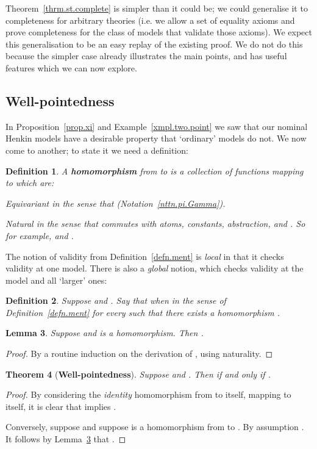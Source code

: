 \documentclass[submission,copyright]{eptcs}
\newtheorem{thrm}{Theorem}[section]
\newtheorem{lemm}[thrm]{Lemma}
\newtheorem{defn}[thrm]{Definition}
\newcommand{\deffont}[1]{\textbf{#1}}
\begin{document}
Theorem~\ref{thrm.st.complete} is simpler than it could be; we could generalise it to completeness for arbitrary theories (i.e. we allow a set of equality axioms and prove completeness for the class of models that validate those axioms).  
We expect this generalisation to be an easy replay of the existing proof.
We do not do this because the simpler case already illustrates the main points, and has useful features which we can now explore.

\subsection{Well-pointedness}
\label{subsect.well-pointed}


In Proposition~\ref{prop.xi} and Example~\ref{xmpl.two.point} we saw that our nominal Henkin models have a desirable property that `ordinary' models do not.
We now come to another; to state it we need a definition:
\begin{defn}
A \deffont{homomorphism}  from  to  is a collection of functions  mapping  to  which are:
\begin{itemize*}
\item
\emph{Equivariant} in the sense that  (Notation~\ref{nttn.pi.Gamma}).
\item
\emph{Natural} in the sense that  commutes with atoms, constants, abstraction, and .
So for example,  and . 
\end{itemize*}
\end{defn}

The notion of validity from Definition~\ref{defn.ment} is \emph{local} in that it checks validity at one model.
There is also a \emph{global} notion, which checks validity at the model and all `larger' ones:
\begin{defn}
Suppose  and .
Say that  when  in the sense of Definition~\ref{defn.ment} for every  such that there exists a homomorphism . 
\end{defn}

\begin{lemm}
\label{lemm.sub.morph.commute}
Suppose  and  is a homomorphism.
Then 
.
\end{lemm}
\begin{proof}
By a routine induction on the derivation of , using naturality.
\end{proof}


\begin{thrm}[\bf Well-pointedness]
\label{thrm.well-pointed}
Suppose  and . 
Then  if and only if . 
\end{thrm}
\begin{proof}
By considering the \emph{identity} homomorphism from  to itself, mapping  to itself, it is clear that  implies .

Conversely, suppose  and suppose  is a homomorphism from  to .
By assumption .
It follows by Lemma~\ref{lemm.sub.morph.commute} that .
\end{proof}
\end{document}
